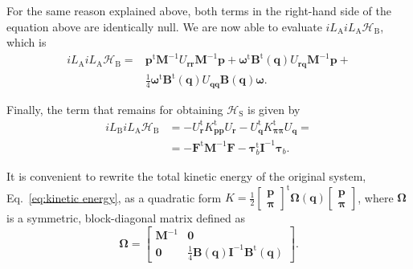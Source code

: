 \documentclass[
	aip,
	jcp,
	reprint,
]{revtex4-1}
\newcommand{\mt}[1]{\boldsymbol{\mathbf{#1}}}          %
\newcommand{\vt}[1]{\boldsymbol{\mathbf{#1}}}          %
\newcommand{\tr}[1]{#1^\text{t}}                       %
\newcommand{\Ham}[1]{{\mathcal H}_\text{#1}}           %
\newcommand{\Liu}[1]{i\!L_\text{#1}}                   %
\begin{document}
For the same reason explained above, both terms in the right-hand side of the equation above are identically null.
We are now able to evaluate $\Liu A \Liu A \Ham B $, which is
\begin{align*}
\Liu A \Liu A \Ham B = &\tr{\vt p} {\mt M}^{-1} U_{\vt r \vt r} {\mt M}^{-1} {\vt p} + \tr{\vt \omega} \tr{\mt B}(\vt q) U_{\vt r \vt q} {\mt M}^{-1} {\vt p}
+ \\
&\frac{1}{4} \tr{\vt \omega} \tr{\mt B}(\vt q) U_{\vt q \vt q} {\mt B}(\vt q) \vt \omega.
\end{align*}

Finally, the term that remains for obtaining $\Ham{S}$ is given by
\begin{align*}
\Liu B \Liu A \Ham B &= -\tr{U_{\vt r}} \tr{K_{\vt p \vt p}} U_{\vt r} - \tr{U_{\vt q}} \tr{K_{\vt \pi \vt \pi}} U_{\vt q} = \\
&= -\tr{\vt F} {\mt M}^{-1} {\vt F} - \tr{\vt \tau}_b {\mt I}^{-1} {\vt \tau}_b.
\end{align*}

It is convenient to rewrite the total kinetic energy of the original system, Eq.~\eqref{eq:kinetic energy}, as a quadratic form $K = \frac{1}{2}\tr{[\substack{\vt p \\ \vt \pi}]} {\mt \Omega}(\vt q) [\substack{\vt p \\ \vt \pi}]$, where $\mt \Omega$ is a symmetric, block-diagonal matrix defined as
\begin{equation}
\label{eq:block-diagonal inverse mass tensor}
{\mt \Omega} = \left[\begin{array}{cc}
{\mt M}^{-1} & \mt 0 \\
\mt 0 & \frac{1}{4} {\mt B}(\vt q) {\mt I}^{-1} \tr{\mt B}(\vt q)
\end{array}\right].
\end{equation}
\end{document}
